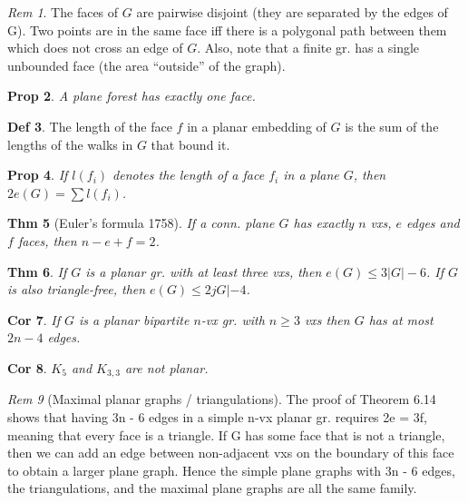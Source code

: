 \documentclass[11pt, fleqn, a4paper, landscape]{article}
\theoremstyle{plain} %
\newtheorem{thm}{Thm}
\newtheorem{pro}[thm]{Prop}
\newtheorem{cor}[thm]{Cor}
\theoremstyle{remark} %
\newtheorem{rem}[thm]{Rem}
\theoremstyle{definition} %
\newtheorem{defi}[thm]{Def}
\begin{document}
\begin{multicols}{5}
\begin{rem}
The faces of $G$ are pairwise disjoint (they are separated by the edges of G). Two points are in the same face iff there is a polygonal path between them which does not cross an edge of $G$. Also, note that a finite gr. has a single unbounded face (the area “outside” of the graph).
\end{rem}

\begin{pro}
A plane forest has exactly one face.
\end{pro}

\begin{defi}
The length of the face $f$ in a planar embedding of $G$ is the sum of the lengths of the walks in $G$ that bound it.
\end{defi}
\addtocounter{thm}{1}
\begin{pro}
If $l(f_i)$ denotes the length of a face $f_i$ in a plane $G$, then $2e(G) = \sum l(f_i)$.
\end{pro}

\begin{thm}[Euler's formula 1758]
If a conn. plane $G$ has exactly $n$ vxs, $e$ edges
and $f$ faces, then $n - e + f = 2$.
\end{thm}

\addtocounter{thm}{1}
\begin{thm}
If $G$ is a planar gr. with at least three vxs, then $e(G) \le 3|G|- 6$. If $G$ is also triangle-free, then $e(G)\le 2jG|- 4$.
\end{thm}

\begin{cor}
If $G$ is a planar bipartite $n$-vx gr. with $n \ge 3$ vxs then $G$ has at most $2n - 4$ edges.
\end{cor}

\begin{cor}
$K_5$ and $K_{3,3}$ are not planar.
\end{cor}

\begin{rem}[Maximal planar graphs / triangulations]
The proof of Theorem 6.14 shows that
having 3n - 6 edges in a simple n-vx planar gr. requires 2e = 3f, meaning that every face is
a triangle. If G has some face that is not a triangle, then we can add an edge between non-adjacent
vxs on the boundary of this face to obtain a larger plane graph. Hence the simple plane graphs
with 3n - 6 edges, the triangulations, and the maximal plane graphs are all the same family.
\end{rem}


\end{multicols}
\end{document}
